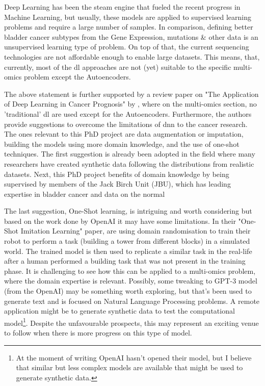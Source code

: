 Deep Learning has been the steam engine that fueled the recent progress in Machine Learning, but usually, these models are applied to supervised learning problems and require a large number of samples. In comparison, defining better bladder cancer subtypes from the Gene Expression, mutations \& other data is an unsupervised learning type of problem. On top of that, the current sequencing technologies are not affordable enough to enable large datasets. This means, that, currently, most of the \acrshort{dl} approaches are not (yet) suitable to the specific multi-omics problem except the Autoencoders.

The above statement is further supported by a review paper on "The Application of Deep Learning in Cancer Prognosis" by \citet{Zhu2020-cv}, where on the multi-omics section, no 'traditional' \acrshort{dl} are used except for the Autoencoders. Furthermore, the authors provide suggestions to overcome the limitations of \acrshort{dnn} to the cancer research. The ones relevant to this PhD project are data augmentation or imputation, building the models using more domain knowledge, and the use of one-shot techniques. The first suggestion is already been adopted in the field where many researchers have created synthetic data \cite{Zhao2012-wj,Leiserson2015-yk} following the distributions from realistic datasets. Next, this PhD project benefits of domain knowledge by being supervised by members of the Jack Birch Unit (JBU), which has leading expertise in bladder cancer and data on the normal

The last suggestion, One-Shot learning, is intriguing and worth considering but based on the work done by OpenAI it may have some limitations. In their "One-Shot Imitation Learning" paper, \citet{duan2017-ae} are using domain randomisation to train their robot to perform a task (building a tower from different blocks) in a simulated world. The trained model is then used to replicate a similar task in the real-life after a human performed a building task that was not present in the training phase. It is challenging to see how this can be applied to a multi-omics problem, where the domain expertise is relevant. Possibly, some tweaking to GPT-3\cite{Brown2020-wh} model (from the OpenAI) may be something worth exploring, but that's been used to generate text and is focused on Natural Language Processing problems. A remote application might be to generate synthetic data to test the computational model\footnote{At the moment of writing OpenAI hasn't opened their model, but I believe that similar but less complex models are available that might be used to generate synthetic data.}. Despite the unfavourable prospects, this may represent an exciting venue to follow when there is more progress on this type of model.

